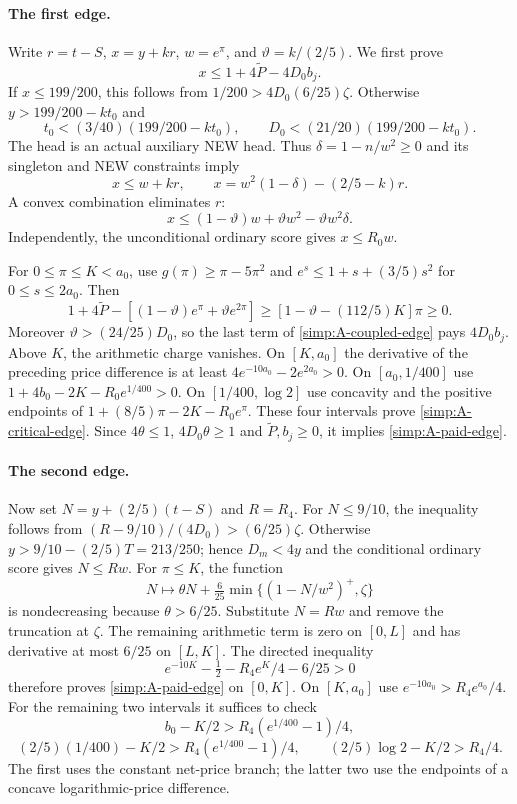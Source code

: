 \paragraph{The first edge.}
Write $r=t-S$, $x=y+kr$, $w=e^\pi$, and $\vartheta=k/(2/5)$.
We first prove
\begin{equation}\label{simp:A-critical-edge}
 x\le1+4\widetilde P-4D_0b_j.
\end{equation}
If $x\le199/200$, this follows from
$1/200>4D_0(6/25)\zeta$.
Otherwise $y>199/200-kt_0$ and
\[
 t_0<(3/40)(199/200-kt_0),\qquad
 D_0<(21/20)(199/200-kt_0).
\]
The head is an actual auxiliary NEW head.  Thus
$\delta=1-n/w^2\ge0$ and its singleton and NEW constraints imply
\[
 x\le w+kr,\qquad
 x=w^2(1-\delta)-(2/5-k)r.
\]
A convex combination eliminates $r$:
\begin{equation}\label{simp:A-coupled-edge}
 x\le(1-\vartheta)w+\vartheta w^2-\vartheta w^2\delta.
\end{equation}
Independently, the unconditional ordinary score gives $x\le R_0w$.

For $0\le\pi\le K<a_0$, use
$g(\pi)\ge\pi-5\pi^2$ and
$e^s\le1+s+(3/5)s^2$ for $0\le s\le2a_0$.
Then
\[
 1+4\widetilde P-[(1-\vartheta)e^\pi+\vartheta e^{2\pi}]
 \ge[1-\vartheta-(112/5)K]\pi\ge0.
\]
Moreover $\vartheta>(24/25)D_0$, so the last term of
\eqref{simp:A-coupled-edge} pays $4D_0b_j$.
Above $K$, the arithmetic charge vanishes.  On $[K,a_0]$ the
derivative of the preceding price difference is at least
$4e^{-10a_0}-2e^{2a_0}>0$.
On $[a_0,1/400]$ use
$1+4b_0-2K-R_0e^{1/400}>0$.
On $[1/400,\log2]$ use concavity and the positive endpoints of
$1+(8/5)\pi-2K-R_0e^\pi$.
These four intervals prove \eqref{simp:A-critical-edge}.
Since $4\theta\le1$, $4D_0\theta\ge1$ and
$\widetilde P,b_j\ge0$, it implies \eqref{simp:A-paid-edge}.

\paragraph{The second edge.}
Now set $N=y+(2/5)(t-S)$ and $R=R_4$.
For $N\le9/10$, the inequality follows from
$(R-9/10)/(4D_0)>(6/25)\zeta$.
Otherwise $y>9/10-(2/5)T=213/250$; hence $D_m<4y$ and
the conditional ordinary score gives $N\le Rw$.
For $\pi\le K$, the function
\[
 N\longmapsto\theta N+\tfrac6{25}
              \min\{(1-N/w^2)^+,\zeta\}
\]
is nondecreasing because $\theta>6/25$.
Substitute $N=Rw$ and remove the truncation at $\zeta$.
The remaining arithmetic term is zero on $[0,L]$ and has derivative
at most $6/25$ on $[L,K]$.
The directed inequality
\[
 e^{-10K}-\tfrac12-R_4e^K/4-6/25>0
\]
therefore proves \eqref{simp:A-paid-edge} on $[0,K]$.
On $[K,a_0]$ use $e^{-10a_0}>R_4e^{a_0}/4$.
For the remaining two intervals it suffices to check
\[
 b_0-K/2>R_4(e^{1/400}-1)/4,
\]
\[
 (2/5)(1/400)-K/2>R_4(e^{1/400}-1)/4,
 \qquad (2/5)\log2-K/2>R_4/4.
\]
The first uses the constant net-price branch; the latter two use
the endpoints of a concave logarithmic-price difference.

